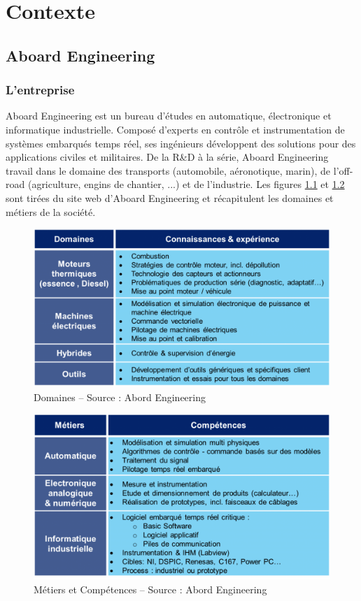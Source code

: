 \chapter{Contexte}
\section{Aboard Engineering}
\subsection{L'entreprise}
Aboard Engineering est un bureau d'études en automatique, électronique et informatique industrielle. Composé d'experts en contrôle et instrumentation de systèmes embarqués temps réel, ses ingénieurs développent des solutions pour des applications civiles et militaires. De la R\&D à la série, Aboard Engineering travail dans le domaine des transports (automobile, aéronotique, marin), de l'off-road (agriculture, engins de chantier, ...) et de l'industrie. Les figures \ref{fig:domaines} et  \ref{fig:metiers} sont tirées du site web d'Aboard Engineering et récapitulent les domaines et métiers de la société.

\begin{figure}[h]
	\center
	\includegraphics[scale=0.4]{images/domaines}
	\caption{Domaines -- Source : Abord Engineering}
	\label{fig:domaines}
\end{figure}

\begin{figure}[h]
	\center
	\includegraphics[scale=0.4]{images/metiers}
	\caption{Métiers et Compétences -- Source : Abord Engineering}
	\label{fig:metiers}
\end{figure}

